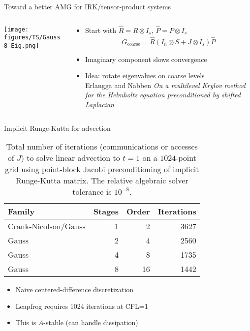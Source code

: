 \documentclass{beamer}
\begin{document}
\begin{frame}{Toward a better AMG for IRK/tensor-product systems}
  \begin{columns}
    \begin{column}{0.3\textwidth}
      \texttt{[image: figures/TS/Gauss8-Eig.png]}
    \end{column}
    \begin{column}{0.7\textwidth}
      \begin{itemize}
      \item Start with $\hat R = R \otimes I_s$, $\hat P = P \otimes I_s$
        \begin{gather*}
          G_{\text{coarse}} = \hat R (I_n \otimes S + J \otimes I_s) \hat P
        \end{gather*}
      \item Imaginary component slows convergence
      \item Idea: rotate eigenvalues on coarse levels \\
        Erlangga and Nabben \emph{On a multilevel Krylov method for the Helmholtz equation preconditioned by shifted Laplacian}
      \end{itemize}
    \end{column}
  \end{columns}
\end{frame}

\begin{frame}{Implicit Runge-Kutta for advection}
  \begin{table}
    \centering
    \caption{Total number of iterations (communications or accesses of $J$) to solve linear advection to $t=1$ on a $1024$-point grid using point-block Jacobi preconditioning of implicit Runge-Kutta matrix.
      The relative algebraic solver tolerance is $10^{-8}$.}\label{tab:irk-advection}
    \begin{tabular}{lrrr}
      \toprule
      Family & Stages & Order & Iterations \\
      \midrule
      Crank-Nicolson/Gauss & 1 & 2 & 3627 \\
      Gauss & 2 & 4 & 2560 \\
      Gauss & 4 & 8 & 1735 \\
      Gauss & 8 & 16 & 1442 \\
      \bottomrule
    \end{tabular}
  \end{table}
  \begin{itemize}
  \item Naive centered-difference discretization
  \item Leapfrog requires 1024 iterations at CFL=1
  \item This is $A$-stable (can handle dissipation)
  \end{itemize}
\end{frame}
\end{document}
